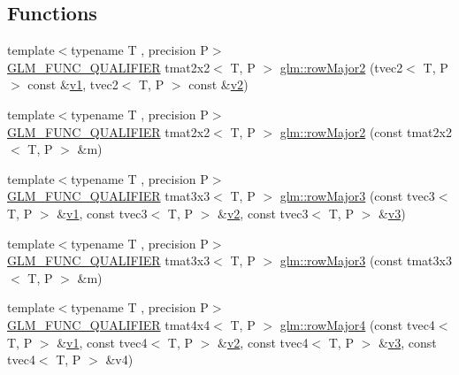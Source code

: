 \subsection*{Functions}
\begin{DoxyCompactItemize}
\item 
{\footnotesize template$<$typename T , precision P$>$ }\\\mbox{\hyperlink{setup_8hpp_a33fdea6f91c5f834105f7415e2a64407}{G\+L\+M\+\_\+\+F\+U\+N\+C\+\_\+\+Q\+U\+A\+L\+I\+F\+I\+ER}} tmat2x2$<$ T, P $>$ \mbox{\hyperlink{group__gtx__matrix__major__storage_ga0c7f4d56a85865f0002127119ab7d551}{glm\+::row\+Major2}} (tvec2$<$ T, P $>$ const \&\mbox{\hyperlink{glad_8h_a0779c3b73f9aa3a0ac5b0139b5d291d9}{v1}}, tvec2$<$ T, P $>$ const \&\mbox{\hyperlink{glad_8h_a9a09a1837922b2b806f4589096a52049}{v2}})
\item 
{\footnotesize template$<$typename T , precision P$>$ }\\\mbox{\hyperlink{setup_8hpp_a33fdea6f91c5f834105f7415e2a64407}{G\+L\+M\+\_\+\+F\+U\+N\+C\+\_\+\+Q\+U\+A\+L\+I\+F\+I\+ER}} tmat2x2$<$ T, P $>$ \mbox{\hyperlink{group__gtx__matrix__major__storage_ga42a006aa66198452bd3c89415f892196}{glm\+::row\+Major2}} (const tmat2x2$<$ T, P $>$ \&m)
\item 
{\footnotesize template$<$typename T , precision P$>$ }\\\mbox{\hyperlink{setup_8hpp_a33fdea6f91c5f834105f7415e2a64407}{G\+L\+M\+\_\+\+F\+U\+N\+C\+\_\+\+Q\+U\+A\+L\+I\+F\+I\+ER}} tmat3x3$<$ T, P $>$ \mbox{\hyperlink{group__gtx__matrix__major__storage_gaba4de9afc4e65ec8ea0403e7cba3fb9f}{glm\+::row\+Major3}} (const tvec3$<$ T, P $>$ \&\mbox{\hyperlink{glad_8h_a0779c3b73f9aa3a0ac5b0139b5d291d9}{v1}}, const tvec3$<$ T, P $>$ \&\mbox{\hyperlink{glad_8h_a9a09a1837922b2b806f4589096a52049}{v2}}, const tvec3$<$ T, P $>$ \&\mbox{\hyperlink{glad_8h_acc806b31cbf466ceba6555983d8b814d}{v3}})
\item 
{\footnotesize template$<$typename T , precision P$>$ }\\\mbox{\hyperlink{setup_8hpp_a33fdea6f91c5f834105f7415e2a64407}{G\+L\+M\+\_\+\+F\+U\+N\+C\+\_\+\+Q\+U\+A\+L\+I\+F\+I\+ER}} tmat3x3$<$ T, P $>$ \mbox{\hyperlink{group__gtx__matrix__major__storage_ga38537061135b55e7a053926ca55e6e20}{glm\+::row\+Major3}} (const tmat3x3$<$ T, P $>$ \&m)
\item 
{\footnotesize template$<$typename T , precision P$>$ }\\\mbox{\hyperlink{setup_8hpp_a33fdea6f91c5f834105f7415e2a64407}{G\+L\+M\+\_\+\+F\+U\+N\+C\+\_\+\+Q\+U\+A\+L\+I\+F\+I\+ER}} tmat4x4$<$ T, P $>$ \mbox{\hyperlink{group__gtx__matrix__major__storage_ga3ce8f2a78fb2f15bf28151ee128b0ae8}{glm\+::row\+Major4}} (const tvec4$<$ T, P $>$ \&\mbox{\hyperlink{glad_8h_a0779c3b73f9aa3a0ac5b0139b5d291d9}{v1}}, const tvec4$<$ T, P $>$ \&\mbox{\hyperlink{glad_8h_a9a09a1837922b2b806f4589096a52049}{v2}}, const tvec4$<$ T, P $>$ \&\mbox{\hyperlink{glad_8h_acc806b31cbf466ceba6555983d8b814d}{v3}}, const tvec4$<$ T, P $>$ \&v4)

\end{DoxyCompactItemize}
